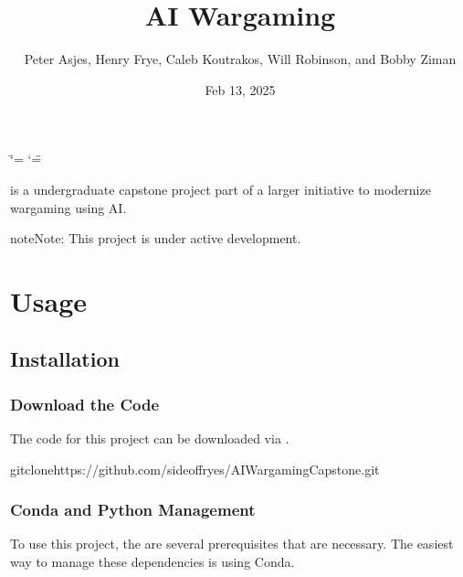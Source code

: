 \documentclass[letterpaper,10pt,english]{sphinxmanual}
\title{AI Wargaming}
\date{Feb 13, 2025}
\author{Peter Asjes, Henry Frye, Caleb Koutrakos, Will Robinson, and Bobby Ziman}
\begin{document}
\ifdefined\shorthandoff
  \ifnum\catcode`\=\string=\active\shorthandoff{=}\fi
  \ifnum\catcode`\"=\active{}\fi
\fi

\pagestyle{empty}
\sphinxmaketitle
\pagestyle{plain}
\sphinxtableofcontents
\pagestyle{normal}
\label{\detokenize{index::doc}}


\sphinxAtStartPar
{} is a undergraduate capstone project part of a larger initiative to modernize wargaming using AI.

\begin{sphinxadmonition}{note}{Note:}
\sphinxAtStartPar
This project is under active development.
\end{sphinxadmonition}

\sphinxstepscope


\chapter{Usage}
\label{\detokenize{usage:usage}}\label{\detokenize{usage::doc}}

\section{Installation}
\label{\detokenize{usage:installation}}

\subsection{Download the Code}
\label{\detokenize{usage:download-the-code}}
\sphinxAtStartPar
The code for this project can be downloaded via .

\begin{sphinxVerbatim}[commandchars=\\\{\}]
gitclonehttps://github.com/sideoffryes/AI\PYGZus{}Wargaming\PYGZus{}Capstone.git
\end{sphinxVerbatim}


\subsection{Conda and Python Management}
\label{\detokenize{usage:conda-and-python-management}}
\sphinxAtStartPar
To use this project, the are several prerequisites that are necessary. The easiest way to manage these dependencies is using Conda.
\end{document}
